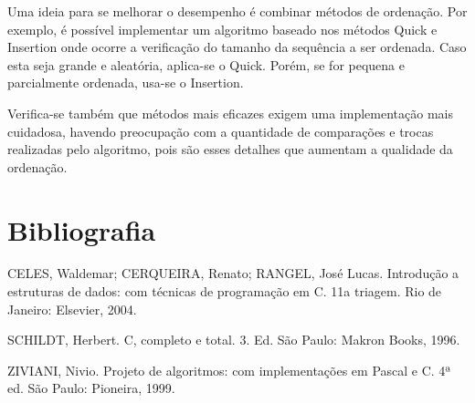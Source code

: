 \documentclass[12pt,a4paper]{article}
\begin{document}
Uma ideia para se melhorar o desempenho é combinar métodos de ordenação. Por exemplo, é possível implementar um algoritmo baseado nos métodos Quick e Insertion onde ocorre a verificação do tamanho da sequência a ser ordenada. Caso esta seja grande e aleatória, aplica-se o Quick. Porém, se for pequena e parcialmente ordenada, usa-se o Insertion.

Verifica-se também que métodos mais eficazes exigem uma implementação mais cuidadosa, havendo preocupação com a quantidade de comparações e trocas realizadas pelo algoritmo, pois são esses detalhes que aumentam a qualidade da ordenação.












\section{Bibliografia}
CELES, Waldemar; CERQUEIRA, Renato; RANGEL, José Lucas. Introdução a estruturas de dados: com técnicas de programação em C. 11a triagem. Rio de Janeiro: Elsevier, 2004.

SCHILDT, Herbert. C, completo e total. 3. Ed. São Paulo: Makron Books, 1996.

ZIVIANI, Nivio. Projeto de algoritmos: com implementações em Pascal e C. 4ª ed. São Paulo: Pioneira, 1999.
\end{document}
